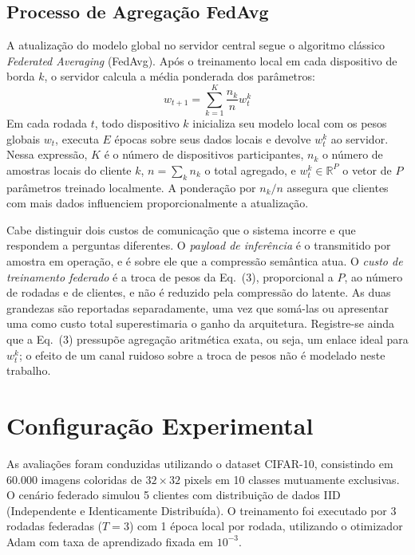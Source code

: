 \documentclass[conference,twocolumn]{IEEEtran}
\begin{document}
\subsection{Processo de Agregação FedAvg}
A atualização do modelo global no servidor central segue o algoritmo clássico \textit{Federated Averaging} (FedAvg). Após o treinamento local em cada dispositivo de borda $k$, o servidor calcula a média ponderada dos parâmetros:
\begin{equation}
    w_{t+1} = \sum_{k=1}^{K} \frac{n_k}{n} w_{t}^k
\end{equation}
Em cada rodada $t$, todo dispositivo $k$ inicializa seu modelo local com os pesos globais $w_t$, executa $E$ épocas sobre seus dados locais e devolve $w_t^k$ ao servidor. Nessa expressão, $K$ é o número de dispositivos participantes, $n_k$ o número de amostras locais do cliente $k$, $n = \sum_{k} n_k$ o total agregado, e $w_t^k \in \mathbb{R}^P$ o vetor de $P$ parâmetros treinado localmente. A ponderação por $n_k/n$ assegura que clientes com mais dados influenciem proporcionalmente a atualização.

Cabe distinguir dois custos de comunicação que o sistema incorre e que respondem a perguntas diferentes. O \emph{payload de inferência} é o transmitido por amostra em operação, e é sobre ele que a compressão semântica atua. O \emph{custo de treinamento federado} é a troca de pesos da Eq.~(3), proporcional a $P$, ao número de rodadas e de clientes, e não é reduzido pela compressão do latente. As duas grandezas são reportadas separadamente, uma vez que somá-las ou apresentar uma como custo total superestimaria o ganho da arquitetura. Registre-se ainda que a Eq.~(3) pressupõe agregação aritmética exata, ou seja, um enlace ideal para $w_t^k$; o efeito de um canal ruidoso sobre a troca de pesos não é modelado neste trabalho.

\section{Configuração Experimental}

As avaliações foram conduzidas utilizando o dataset CIFAR-10, consistindo em 60.000 imagens coloridas de $32 \times 32$ pixels em 10 classes mutuamente exclusivas. O cenário federado simulou 5 clientes com distribuição de dados IID (Independente e Identicamente Distribuída). O treinamento foi executado por 3 rodadas federadas ($T=3$) com 1 época local por rodada, utilizando o otimizador Adam com taxa de aprendizado fixada em $10^{-3}$.
\end{document}
